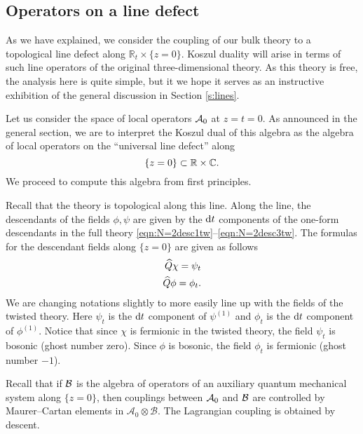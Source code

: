 \documentclass[11pt]{amsart}
\begin{document}
\subsection{Operators on a line defect}
As we have explained, we consider the coupling of our bulk theory to a topological line defect along $\mathbb{R}_t \times \{z=0\}$. 
Koszul duality will arise in terms of such line operators of the original three-dimensional theory. 
As this theory is free, the analysis here is quite simple, but it we hope it serves as an instructive exhibition of the general discussion in Section \ref{s:lines}. 

Let us consider the space of local operators $\cA_0$ at $z=t=0$. 
As announced in the general section, we are to interpret the Koszul dual of this algebra as the algebra of local operators on the ``universal line defect'' along
\[
\{z=0\} \subset \RR \times \CC .
\]
We proceed to compute this algebra from first principles.  

Recall that the theory is topological along this line. 
Along the line, the descendants of the fields $\phi, \psi$ are given by the $\d t$ components of the one-form descendants in the full theory \eqref{eqn:N=2desc1tw}--\eqref{eqn:N=2desc3tw}. 
The formulas for the descendant fields along $\{z=0\}$ are given as follows
\begin{align*}
\Hat{Q} \chi = \psi_t \\
\Hat{Q} \phi = \phi_t . 
\end{align*}
We are changing notations slightly to more easily line up with the fields of the twisted theory. 
Here $\psi_t$ is the $\d t$ component of $\psi^{(1)}$ and $\phi_t$ is the $\d t$ component of $\phi^{(1)}$. 
Notice that since $\chi$ is fermionic in the twisted theory, the field $\psi_t$ is bosonic (ghost number zero). 
Since $\phi$ is bosonic, the field $\phi_t$ is fermionic (ghost number $-1$). 



Recall that if $\cB$ is the algebra of operators of an auxiliary quantum mechanical system along $\{z=0\}$, then couplings between $\cA_0$ and $\cB$ are controlled by Maurer--Cartan elements in $\mathcal{A}_0\otimes \mathcal{B}$.
The Lagrangian coupling is obtained by descent. 
\end{document}
